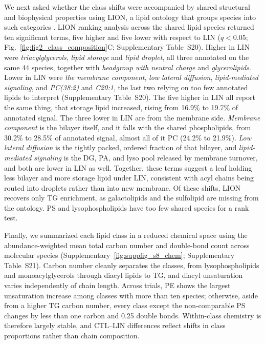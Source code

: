 \documentclass[9pt,twocolumn,twoside]{rilabRxiv}
\begin{document}
We next asked whether the class shifts were accompanied by shared structural and biophysical properties using LION, a lipid ontology that groups species into such categories \citep{Molenaar2019}. LION ranking analysis across the shared lipid species returned ten significant terms, five higher and five lower with respect to LIN (\(q<0.05\); Fig.~\ref{fig:fig2_class_composition}C; Supplementary Table~S20). Higher in LIN were \textit{triacylglycerols}, \textit{lipid storage} and \textit{lipid droplet}, all three annotated on the same 44 species, together with \textit{headgroup with neutral charge} and \textit{glycerolipids}. Lower in LIN were \textit{the membrane component}, \textit{low lateral diffusion}, \textit{lipid-mediated signaling}, and \textit{PC(38:2)} and \textit{C20:1}, the last two relying on too few annotated lipids to interpret (Supplementary Table~S20). The five higher in LIN all report the same thing, that storage lipid increased, rising from 16.9\% to 19.7\% of annotated signal. The three lower in LIN are from the membrane side. \textit{Membrane component} is the bilayer itself, and it falls with the shared phospholipids, from 30.2\% to 28.5\% of annotated signal, almost all of it PC (24.2\% to 21.9\%). \textit{Low lateral diffusion} is the tightly packed, ordered fraction of that bilayer, and \textit{lipid-mediated signaling} is the DG, PA, and lyso pool released by membrane turnover, and both are lower in LIN as well. Together, these terms suggest a leaf holding less bilayer and more storage lipid under LIN, consistent with acyl chains being routed into droplets rather than into new membrane. Of these shifts, LION recovers only TG enrichment, as galactolipids and the sulfolipid are missing from the ontology. PS and lysophospholipids have too few shared species for a rank test.

Finally, we summarized each lipid class in a reduced chemical space using the abundance-weighted mean total carbon number and double-bond count across molecular species (Supplementary~\ref{fig:suppfig_s8_chem}; Supplementary Table~S21). Carbon number cleanly separates the classes, from lysophospholipids and monoacylglycerols through diacyl lipids to TG, and diacyl unsaturation varies independently of chain length. Across trials, PE shows the largest unsaturation increase among classes with more than ten species; otherwise, aside from a higher TG carbon number, every class except the non-comparable PS changes by less than one carbon and 0.25 double bonds. Within-class chemistry is therefore largely stable, and CTL--LIN differences reflect shifts in class proportions rather than chain composition.
\end{document}
